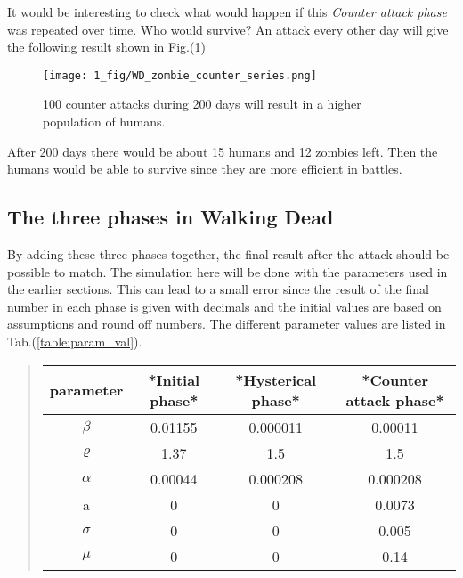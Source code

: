 \documentclass[%
twoside,                 %
final,                   %
chapterprefix=true,      %
open=right               %
10pt]{book}
\begin{document}
It would be interesting to check what would happen if this \emph{Counter attack phase} was repeated over time. Who would survive? An attack every other day will give the following result shown in Fig.(\ref{fig:counter_series})


\begin{figure}[ht]
  \centerline{\texttt{[image: 1\_fig/WD\_zombie\_counter\_series.png]}}
  \caption{
  \label{fig:counter_series} 100 counter attacks during 200 days will result in a higher population of humans.
  }
\end{figure}


After 200 days there would be about 15 humans and 12 zombies left. Then the humans would be able to survive since they are more efficient in battles. 

\subsection{The three phases in Walking Dead}
By adding these three phases together, the final result after the attack should be possible to match. The simulation here will be done with the parameters used in the earlier sections. This can lead to a small error since the result of the final number in each phase is given with decimals and the initial values are based on assumptions and round off numbers. The different parameter values are listed in Tab.(\ref{table:param_val}). 

\label{table:param_val}

\begin{quote}
\begin{tabular}{cccc}
\hline
\multicolumn{1}{c}{ parameter } & \multicolumn{1}{c}{ *Initial phase* } & \multicolumn{1}{c}{ *Hysterical phase* } & \multicolumn{1}{c}{ *Counter attack phase* } \\
\hline
$\beta$   & 0.01155         & 0.000011           & 0.00011                \\
$\varrho$ & 1.37            & 1.5                & 1.5                    \\
$\alpha$  & 0.00044         & 0.000208           & 0.000208               \\
a         & 0               & 0                  & 0.0073                 \\
$\sigma$  & 0               & 0                  & 0.005                  \\
$\mu$     & 0               & 0                  & 0.14                   \\
\hline
\end{tabular}
\end{quote}
\end{document}
